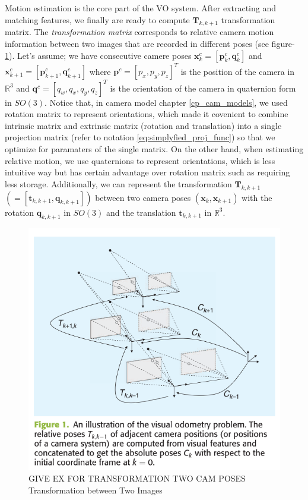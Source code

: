 \documentclass[a4paper]{report}
\numberwithin{figure}{section}
\newcommand{\R}{\mathbb{R}}
\begin{document}
Motion estimation is the core part of the VO system. After 
extracting and matching features,
we finally are ready to compute $\mathbf{T}_{k, k+1}$ transformation matrix. 
The \textit{transformation matrix} corresponds to relative camera motion information between 
two images that are recorded in different poses (see figure-\ref{fig:transformation_ij}).
Let's assume; we have 
consecutive camere poses $\mathbf{x}_k^c = [\mathbf{p}_k^c, \mathbf{q}_k^c]$ and 
$\mathbf{x}_{k+1}^c = [\mathbf{p}_{k+1}^c, \mathbf{q}_{k+1}^c]$ where 
$\mathbf{p}^c = [p_x, p_y, p_z]^T$ is the position of the camera in $\R^3$
and $\mathbf{q}^c = [q_w, q_x, q_y, q_z]^T$ is 
the orientation of the camera in quaternion form in $SO(3)$. 
Notice that, in camera model chapter 
\ref{cp_cam_models}, we used rotation matrix to represent orientations, 
which made it covenient to combine intrinsic matrix and extrinsic matrix 
(rotation and translation) into a single projection matrix 
(refer to notation \ref{eq:simplyfied_proj_func})
so that 
we optimize for paramaters of the single matrix. On the other hand, when 
estimating relative motion, we use quaternions to represent orientations, 
which is less intuitive way but 
has certain advantage over rotation matrix such as requiring less storage.
Additionally, we can represent the transformation 
$\mathbf{T}_{k,k+1}$ $(= [\mathbf{t}_{k,k+1},\mathbf{q}_{k,k+1}])$ between two camera poses 
$(\mathbf{x}_k,\mathbf{x}_{k+1})$ with the rotation $\mathbf{q}_{k,k+1}$ in $SO(3)$  
and the translation $\mathbf{t}_{k,k+1}$ in $\R^3$.

\begin{figure}[H]
	\centering
  \includegraphics[width=0.7\linewidth,natwidth=640,natheight=640]
  {fig/ref_imgs/transformation_ij.png}
  \caption{GIVE EX FOR TRANSFORMATION TWO CAM POSES Transformation between Two Images}
	\label{fig:transformation_ij}
\end{figure}
\end{document}
